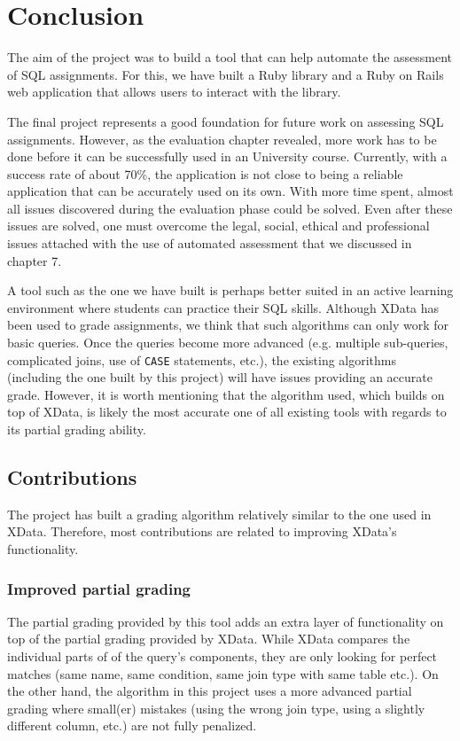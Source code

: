 \chapter{Conclusion}

The aim of the project was to build a tool that can help automate the assessment of SQL assignments. For this, we have built a Ruby library and a Ruby on Rails web application that allows users to interact with the library. 

The final project represents a good foundation for future work on assessing SQL assignments.  However, as the evaluation chapter revealed, more work has to be done before it can be successfully used in an University course. Currently, with a success rate of about 70\%, the application is not close to being a reliable application that can be accurately used on its own. With more time spent, almost all issues discovered during the evaluation phase could be solved. Even after these issues are solved, one must overcome the legal, social, ethical and professional issues attached with the use of automated assessment that we discussed in chapter 7.

A tool such as the one we have built is perhaps better suited in an active learning environment where students can practice their SQL skills. Although XData has been used to grade assignments, we think that such algorithms can only work for basic queries. Once the queries become more advanced (e.g. multiple sub-queries, complicated joins, use of \texttt{CASE} statements, etc.), the existing algorithms (including the one built by this project) will have issues providing an accurate grade. However, it is worth mentioning that the algorithm used, which builds on top of XData, is likely the most accurate one of all existing tools with regards to its partial grading ability.

\section{Contributions}
The project has built a grading algorithm relatively similar to the one used in XData. Therefore, most contributions are related to improving XData's functionality.

\subsection{Improved partial grading}
The partial grading provided by this tool adds an extra layer of functionality on top of the partial grading provided by XData. While XData compares the individual parts of of the query's components, they are only looking for perfect matches (same name, same condition, same join type with same table etc.). On the other hand, the algorithm in this project uses a more advanced partial grading where small(er) mistakes (using the wrong join type, using a slightly different column, etc.) are not fully penalized. 

